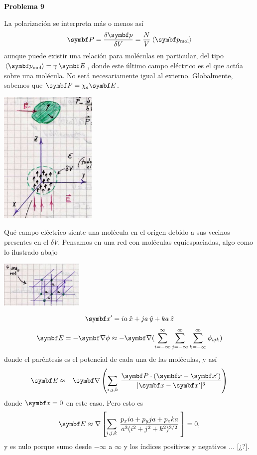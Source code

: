 \documentclass[10pt,oneside]{CBFT_book}
\begin{document}
\begin{ejemplo}{\bf Problema 9}
 
La polarización se interpreta más o menos así
\[
	\vb{P} = \frac{\delta\vb{p}}{\delta V} = 
	\frac{N}{V} \: \langle \vb{p}_{\text{mol}} \rangle 
\]
aunque puede existir una relación para moléculas en particular, del tipo
$ \langle \vb{p}_{\text{mol}} \rangle = \gamma \: \vb{E} $, donde este 
último campo eléctrico es el que actúa sobre una molécula. No será necesariamente
igual al externo.
Globalmente, sabemos que $ \vb{P} = \chi_e \vb{E}$.

\includegraphics[width=0.35\textwidth]{images/fig_ft1_problema9A_medios.jpg} 

Qué campo eléctrico siente una molécula en el origen debido a sus vecinos
presentes en el $\delta V$.
Pensamos en una red con moléculas equiespaciadas, algo como lo ilustrado abajo

\includegraphics[width=0.3\textwidth]{images/fig_ft1_problema9B_medios.jpg} 
 
\[
	\vbx'= i a \xver + j a \yver + k a \zver 
\] 
\[
	\vb{E} = - \Nabla \phi \approx 
	- \Nabla ( \sum_{i=-\infty}^\infty \sum_{j=-\infty}^\infty 
	\sum_{k=-\infty}^\infty \phi_{ijk} )
\]
donde el paréntesis es el potencial de cada una de las moléculas, y así
\[
	\vb{E} \approx - \Nabla \left( \sum_{i,j,k} \: 
	\frac{\vb{P}\cdot(\vbx-\vbx')}{|\vbx-\vbx'|^3}\right) 
\]
donde $\vbx=0$ en este caso. Pero esto es
\[
	\vb{E} \approx \nabla 
	\left[ \sum_{i,j,k} \: \frac{ p_x i a + p_y j a + p_z k a }
	{a^3 (i^2 + j^2 + k^2 )^{3/2}} \: \right] = 0, 
\]
y es nulo porque sumo desde $-\infty$ a $\infty$ y los índices positivos
y negativos ... [¿?].


\end{ejemplo}
\end{document}
